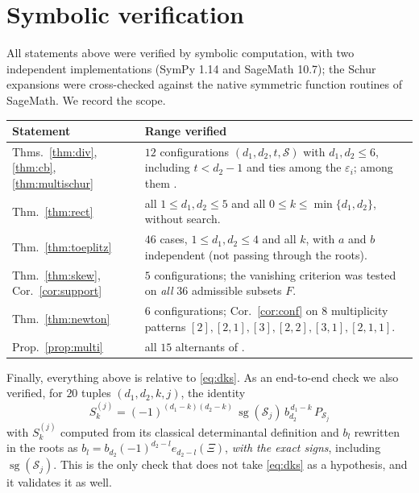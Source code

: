 \documentclass[11pt,reqno]{amsart}
\theoremstyle{plain}
\theoremstyle{definition}
\DeclareMathOperator{\sg}{sg}
\newcommand{\bX}{\Xi}
\newcommand{\cS}{\mathcal{S}}
\begin{document}
\section{Symbolic verification}\label{sec:verif}

All statements above were verified by symbolic computation, with two independent
implementations (SymPy 1.14 and SageMath 10.7); the Schur expansions were
cross-checked against the native symmetric function routines of SageMath. We
record the scope.

\begin{center}
\renewcommand{\arraystretch}{1.25}
\begin{tabular}{>{\raggedright\arraybackslash}p{}%
                >{\raggedright\arraybackslash}p{}}
\hline
Statement & Range verified\\
\hline
Thms.~\ref{thm:div}, \ref{thm:cb}, \ref{thm:multischur}
  & $12$ configurations $(d_1,d_2,t,\cS)$ with $d_1,d_2\le6$, including
    $t<d_2-1$ and ties among the $\varepsilon_i$; among them
    \cite[Ex.~2.3 and 2.4]{DKS05}.\\
Thm.~\ref{thm:rect}
  & all $1\le d_1,d_2\le5$ and all $0\le k\le\min\{d_1,d_2\}$, without search.\\
Thm.~\ref{thm:toeplitz}
  & $46$ cases, $1\le d_1,d_2\le4$ and all $k$, with $a$ and $b$ independent
    (not passing through the roots).\\
Thm.~\ref{thm:skew}, Cor.~\ref{cor:support}
  & $5$ configurations; the vanishing criterion was tested on \emph{all} $36$
    admissible subsets $F$.\\
Thm.~\ref{thm:newton}
  & $6$ configurations; Cor.~\ref{cor:conf} on $8$ multiplicity patterns
    $[2],[2,1],[3],[2,2],[3,1],[2,1,1]$.\\
Prop.~\ref{prop:multi}
  & all $15$ alternants of \cite[Ex.~3.4]{DKS05}.\\
\hline
\end{tabular}
\end{center}

Finally, everything above is relative to \eqref{eq:dks}. As an end-to-end check we
also verified, for $20$ tuples $(d_1,d_2,k,j)$, the identity
\[
  S_k^{(j)}=(-1)^{(d_1-k)(d_2-k)}\,\sg(\cS_j)\,b_{d_2}^{\,d_1-k}\,P_{\cS_j}
\]
with $S_k^{(j)}$ computed from its classical determinantal definition
\cite[(3)]{DKS05} and $b_l$ rewritten in the roots as
$b_l=b_{d_2}(-1)^{d_2-l}e_{d_2-l}(\bX)$, \emph{with the exact signs}, including
$\sg(\cS_j)$. This is the only check that does not take \eqref{eq:dks} as a
hypothesis, and it validates it as well.
\end{document}
